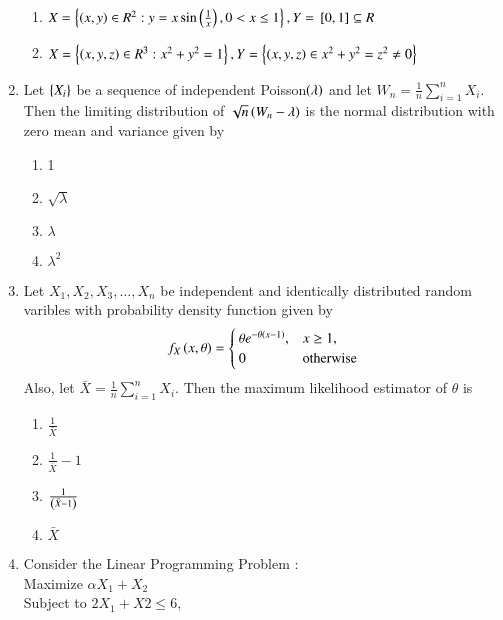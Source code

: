 \documentclass[journal]{IEEEtran}
\begin{document}
\begin{enumerate}
\begin{enumerate}
    \item $X=\left\{\left(x,y\right)\in R^2:y=x\sin\left(\frac{1}{x}\right),0<x \le 1\right\}, Y={}\left[0,1\right]\subseteq R$
    \item $X=\left\{\left(x,y,z\right)\in R^3 : x^2+y^2=1\right\}, Y=\left\{\left(x,y,z\right)\in x^2+y^2=z^2\neq0\right\}$
\end{enumerate}
\item Let $\left\{X_i\right\}$ be a sequence of independent Poisson$\left(\lambda\right)$ and let $W_n=\frac{1}{n}\sum_{i=1}^n X_i$. Then the limiting distribution of $\sqrt{n}\left(W_n-\lambda\right)$ is the normal distribution with zero mean and variance given by 
\begin{multicols}{4}
    \begin{enumerate}
        \item 1
        \item $\sqrt{\lambda}$
        \item $\lambda$
        \item $\lambda^2$
    \end{enumerate}
\end{multicols}
\item Let $X_1,X_2,X_3,\dots,X_n$ be independent and identically distributed random varibles with probability density function given by 
\begin{align*}
    f_X\left(x,\theta\right)=
    \begin{cases}
        \theta e^{-\theta\left(x-1\right)}, & x \ge 1,\\ 0 & \text{otherwise} 
    \end{cases}
\end{align*}
Also, let $\bar{X}=\frac{1}{n}\sum_{i=1}^nX_i$. Then the maximum likelihood estimator of $\theta$ is 
\begin{multicols}{4}
    \begin{enumerate}
        \item $\frac{1}{\bar{X}}$
        \item $\frac{1}{\bar{X}}-1$
        \item $\frac{1}{\left(\bar{X}-1\right)}$
        \item $\bar{X}$
    \end{enumerate}
\end{multicols}
\item Consider the Linear Programming Problem :\\
\hspace{2cm} Maximize \hspace{0.2cm} $\alpha X_1+X_2$\\
\hspace{2cm} Subject to \hspace{.02cm} $2X_1+X2\leq 6,$


\end{enumerate}
\end{document}
